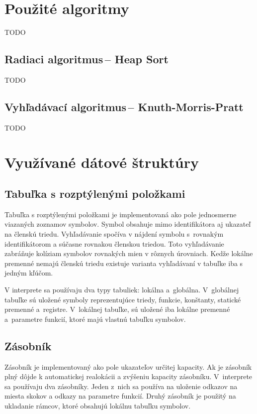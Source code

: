\documentclass[11pt,a4paper]{article}
\begin{document}
    
    

\section{Použité algoritmy} 
\label{algoritmy}

TODO

    \subsection{Radiaci algoritmus\,-- Heap Sort}
    
    TODO

    \subsection{Vyhľadávací algoritmus\,-- Knuth-Morris-Pratt}
    
    TODO
    
\section{Využívané dátové štruktúry} 
\label{struktury}

        \subsection{Tabuľka s rozptýlenými položkami}
        Tabuľka s rozptýlenými položkami je implementovaná ako pole jednosmerne viazaných zoznamov symbolov. Symbol obsahuje
        mimo identifikátora aj ukazateľ na členskú triedu. Vyhľadávanie spočíva v nájdení symbolu s~rovnakým identifikátorom
        a súčasne rovnakou členskou triedou. Toto vyhľadávanie zabráňuje kolíziam symbolov rovnakých mien v rôznych úrovniach.
        Kedže lokálne premenné nemajú členskú triedu existuje varianta vyhľadávaní v tabuľke iba s jedným kľúčom.

        V interprete sa používaju dva typy tabuliek: lokálna a~globálna. V~globálnej tabuľke sú uložené symboly reprezentujúce
        triedy, funkcie, konštanty, statické premenné a~registre. V~lokálnej tabuľke, sú uložené iba lokálne premenné a~parametre
        funkcií, ktoré majú vlastnú tabuľku symbolov.

        \subsection{Zásobník}
        Zásobník je implementovaný ako pole ukazateľov určitej kapacity. Ak je zásobník plný dôjde k automatickej realokácii a zvýšeniu kapacity zásobníku. V~interprete sa používaju dva zásobníky. Jeden z~nich sa používa na uloženie odkazov na miesta skokov a odkazy na parametre funkcií. Druhý zásobník je použitý na ukladanie rámcov, ktoré obsahujú lokálnu tabuľku symbolov.
\end{document}
